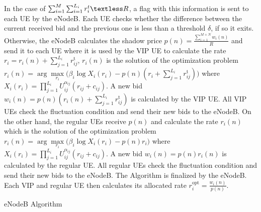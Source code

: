 \documentclass[journal]{IEEEtran} 				\IEEEoverridecommandlockouts 						\usepackage{amsmath,amssymb}
\begin{document}
In the case of $\sum_{i=1}^{M}\sum_{i=1}^{L_i}r_{i}^{t}\textless R$, a flag with this information is sent to each UE by the eNodeB. Each UE checks whether the difference between the current received bid and the previous one is less than a threshold $\delta$, if so it exits. Otherwise, the eNodeB calculates the shadow price $p(n)=\frac{\sum_{i=1}^{M+N}w_{i}(n)}{R}$ and send it to each UE where it is used by the VIP UE to calculate the rate $r_{i}=r_{i}(n)+\sum_{j=1}^{L_i}r_{ij}^{\text{t}}$, $r_i(n)$ is the solution of the optimization problem $r_{i}(n) = \arg \underset{r_{i}}\max \Big(\beta_i \log X_i(r_{i}) - p(n)(r_{i}+\sum_{j=1}^{L_i}r_{ij}^{\text{t}})\Big)$ where $X_i(r_i) = \prod_{j=1}^{L_i}U_{ij}^{\alpha_{ij}}(r_{ij}+c_{ij})$. A new bid $w_{i}(n)= p(n)(r_{i}(n)+\sum_{j=1}^{L_i}r_{ij}^{\text{t}})$ is calculated by the VIP UE. All VIP UEs check the fluctuation condition and send their new bids to the eNodeB. On the other hand, the regular UEs receive $p(n)$ and calculate the rate $r_{i}(n)$ which is the solution of the optimization problem $r_{i}(n) = \arg \underset{r_{i}}\max \Big(\beta_i \log X_i(r_{i}) - p(n)r_{i}\Big)$ where $X_i(r_i) = \prod_{j=1}^{L_i}U_{ij}^{\alpha_{ij}}(r_{ij}+c_{ij})$. A new bid $w_{i}(n)= p(n) r_{i}(n)$ is calculated by the regular UE. All regular UEs check the fluctuation condition and send their new bids to the eNodeB. The Algorithm is finalized by the eNodeB. Each VIP and regular UE then calculates its allocated rate $r_{i} ^{\text{opt}}= \frac{w_{i}(n)}{p(n)}$.
\begin{algorithm}\caption{eNodeB Algorithm} \label{alg:eNodeB_first-stage}
\begin{algorithmic}
\LOOP
 
 
		    \ELSE
        \ENDIF
        \ENDWHILE
	 		
     
		    \ELSE
        \ENDIF
        \ENDWHILE
\ENDLOOP
\end{algorithmic}
\end{algorithm}
\end{document}
